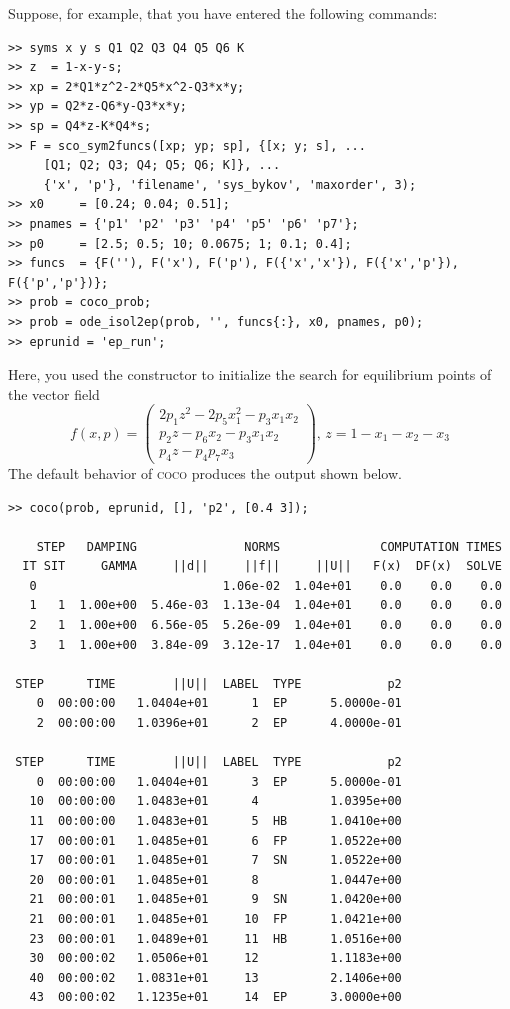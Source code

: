 Suppose, for example, that you have entered the following commands:
\begin{lstlisting}[language=coco-highlight,frame=lines]
>> syms x y s Q1 Q2 Q3 Q4 Q5 Q6 K
>> z  = 1-x-y-s;
>> xp = 2*Q1*z^2-2*Q5*x^2-Q3*x*y;
>> yp = Q2*z-Q6*y-Q3*x*y;
>> sp = Q4*z-K*Q4*s;
>> F = sco_sym2funcs([xp; yp; sp], {[x; y; s], ...
     [Q1; Q2; Q3; Q4; Q5; Q6; K]}, ...
     {'x', 'p'}, 'filename', 'sys_bykov', 'maxorder', 3);
>> x0     = [0.24; 0.04; 0.51];
>> pnames = {'p1' 'p2' 'p3' 'p4' 'p5' 'p6' 'p7'};
>> p0     = [2.5; 0.5; 10; 0.0675; 1; 0.1; 0.4];
>> funcs  = {F(''), F('x'), F('p'), F({'x','x'}), F({'x','p'}), F({'p','p'})};
>> prob = coco_prob;
>> prob = ode_isol2ep(prob, '', funcs{:}, x0, pnames, p0);
>> eprunid = 'ep_run';
\end{lstlisting}
Here, you used the  constructor to initialize the search for equilibrium points of the vector field
\[
f(x,p)=\begin{pmatrix}2p_1z^2-2p_5x_1^2-p_3x_1x_2\\p_2z-p_6x_2-p_3x_1x_2\\p_4z-p_4p_7x_3\end{pmatrix},\,z=1-x_1-x_2-x_3
\]
The default behavior of \textsc{coco} produces the output shown below.
\begin{lstlisting}[language=coco-highlight,frame=lines]
>> coco(prob, eprunid, [], 'p2', [0.4 3]);

    STEP   DAMPING               NORMS              COMPUTATION TIMES
  IT SIT     GAMMA     ||d||     ||f||     ||U||   F(x)  DF(x)  SOLVE
   0                          1.06e-02  1.04e+01    0.0    0.0    0.0
   1   1  1.00e+00  5.46e-03  1.13e-04  1.04e+01    0.0    0.0    0.0
   2   1  1.00e+00  6.56e-05  5.26e-09  1.04e+01    0.0    0.0    0.0
   3   1  1.00e+00  3.84e-09  3.12e-17  1.04e+01    0.0    0.0    0.0

 STEP      TIME        ||U||  LABEL  TYPE            p2
    0  00:00:00   1.0404e+01      1  EP      5.0000e-01
    2  00:00:00   1.0396e+01      2  EP      4.0000e-01

 STEP      TIME        ||U||  LABEL  TYPE            p2
    0  00:00:00   1.0404e+01      3  EP      5.0000e-01
   10  00:00:00   1.0483e+01      4          1.0395e+00
   11  00:00:00   1.0483e+01      5  HB      1.0410e+00
   17  00:00:01   1.0485e+01      6  FP      1.0522e+00
   17  00:00:01   1.0485e+01      7  SN      1.0522e+00
   20  00:00:01   1.0485e+01      8          1.0447e+00
   21  00:00:01   1.0485e+01      9  SN      1.0420e+00
   21  00:00:01   1.0485e+01     10  FP      1.0421e+00
   23  00:00:01   1.0489e+01     11  HB      1.0516e+00
   30  00:00:02   1.0506e+01     12          1.1183e+00
   40  00:00:02   1.0831e+01     13          2.1406e+00
   43  00:00:02   1.1235e+01     14  EP      3.0000e+00
\end{lstlisting}
